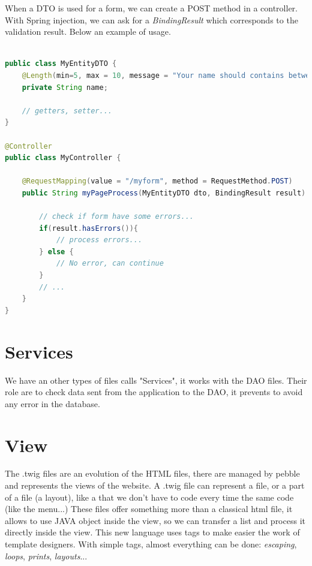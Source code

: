 When a DTO is used for a form, we can create a POST method in a controller. With Spring injection, we can ask for a \textit{BindingResult} which corresponds to the validation result. Below an example of usage.


\begin{lstlisting}[language=java,caption={JAVA}]

public class MyEntityDTO {
	@Length(min=5, max = 10, message = "Your name should contains between 5 and 10 characters.")
	private String name;
	
	// getters, setter...
}

@Controller
public class MyController {

	@RequestMapping(value = "/myform", method = RequestMethod.POST)
	public String myPageProcess(MyEntityDTO dto, BindingResult result) {
		
		// check if form have some errors...
		if(result.hasErrors()){
			// process errors... 
		} else {
			// No error, can continue
		}		
		// ...
	}
}
\end{lstlisting}




\section{Services}

We have an other types of files calls "Services", it works with the DAO files.
Their role are to check data sent from the application to the DAO, it prevents to avoid any error in the database.


\section{View}

The .twig files are an evolution of the HTML files, there are managed by pebble and represents the views of the website.
A .twig file can represent a file, or a part of a file (a layout), like a that we don't have to code every time the same code (like the menu...)
These files offer something more than a classical html file, it allows to use JAVA object inside the view, so we can transfer a list and process it directly inside the view. This new language uses tags to make easier the work of template designers. With simple tags, almost everything can be done: \textit{escaping}, \textit{loops}, \textit{prints}, \textit{layouts}...



